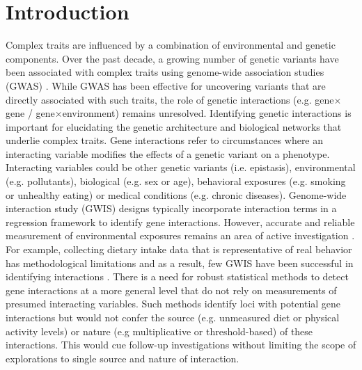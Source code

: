 \documentclass[12pt]{article}
\begin{document}
\section{Introduction}
\indent \indent Complex traits are influenced by a combination of environmental and genetic components. Over the past decade, a growing number of genetic variants have been associated with complex traits using genome-wide association studies (GWAS) \cite{wood2014defining, locke2015genetic, global2013discovery}. While GWAS has been effective for uncovering variants that are directly associated with such traits, the role of genetic interactions (e.g. gene$\times$gene / gene$\times$environment) remains unresolved. Identifying genetic interactions is important for elucidating the genetic architecture and biological networks that underlie complex traits. Gene interactions refer to circumstances where an interacting variable modifies the effects of a genetic variant on a phenotype. Interacting variables could be other genetic variants (i.e. epistasis), environmental (e.g. pollutants), biological (e.g. sex or age), behavioral exposures (e.g. smoking or unhealthy eating) or medical conditions (e.g. chronic diseases). Genome-wide interaction study (GWIS) designs typically incorporate interaction terms in a regression framework to identify gene interactions.  However, accurate and reliable measurement of environmental exposures remains an area of active investigation \cite{reddon2016physical}. For example, collecting dietary intake data that is representative of real behavior has methodological limitations and as a result, few GWIS have been successful in identifying interactions \cite{grandjean2012dietary, risch2009interaction, scott2012no, culverhouse2017collaborative}. There is a need for robust statistical methods to detect gene interactions at a more general level that do not rely on measurements of presumed interacting variables. Such methods identify loci with potential gene interactions but would not confer the source (e.g. unmeasured diet or physical activity levels) or nature (e.g multiplicative or threshold-based) of these interactions. This would cue follow-up investigations without limiting the scope of explorations to single source and nature of interaction. 
\end{document}
